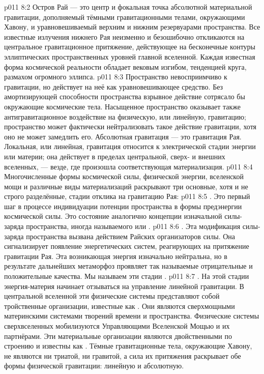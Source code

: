 \vs p011 8:2 Остров Рай --- это центр и фокальная точка абсолютной материальной гравитации, дополняемый тёмными гравитационными телами, окружающими Хавону, и уравновешиваемый верхним и нижним резервуарами пространства. Все известные излучения нижнего Рая неизменно и безошибочно откликаются на центральное гравитационное притяжение, действующее на бесконечные контуры эллиптических пространственных уровней главной вселенной. Каждая известная форма космической реальности обладает вековым изгибом, тенденцией круга, размахом огромного эллипса.
\vs p011 8:3 Пространство невосприимчиво к гравитации, но действует на неё как уравновешивающее средство. Без амортизирующей способности пространства взрывное действие сотрясало бы окружающие космические тела. Насыщенное пространство оказывает также антигравитационное воздействие на физическую, или линейную, гравитацию; пространство может фактически нейтрализовать такое действие гравитации, хотя оно не может замедлить его. Абсолютная гравитация --- это гравитация Рая. Локальная, или линейная, гравитация относится к электрической стадии энергии или материи; она действует в пределах центральной, сверх\hyp{} и внешних вселенных, --- везде, где произошла соответствующая материализация.
\vs p011 8:4 \pc Многочисленные формы космической силы, физической энергии, вселенской мощи и различные виды материализаций раскрывают три основные, хотя и не строго разделённые, стадии отклика на гравитацию Рая:
\vs p011 8:5 . Это первый шаг в процессе индивидуации потенции пространства в формы предэнергии космической силы. Это состояние аналогично концепции изначальной силы\hyp{}заряда пространства, иногда называемого  или .
\vs p011 8:6 . Эта модификация силы\hyp{}заряда пространства вызвана действием Райских организаторов силы. Она сигнализирует появление энергетических систем, реагирующих на притяжение гравитации Рая. Эта возникающая энергия изначально нейтральна, но в результате дальнейших метаморфоз проявляет так называемые отрицательные и положительные качества. Мы называем эти стадии .
\vs p011 8:7 . На этой стадии энергия\hyp{}материя начинает отзываться на управление линейной гравитации. В центральной вселенной эти физические системы представляют собой тройственные организации, известные как . Они являются сверхмощными материнскими системами творений времени и пространства. Физические системы сверхвселенных мобилизуются Управляющими Вселенской Мощью и их партнёрами. Эти материальные организации являются двойственными по строению и известны как . Тёмные гравитационные тела, окружающие Хавону, не являются ни триатой, ни гравитой, а сила их притяжения раскрывает обе формы физической гравитации: линейную и абсолютную.

